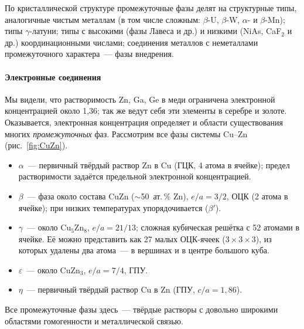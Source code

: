 По кристаллической структуре промежуточные фазы делят на структурные
типы, аналогичные чистым металлам (в том числе сложным: $\beta$-U,
$\beta$-W, $\alpha$- и $\beta$-Mn); типы $\gamma$-латуни; типы с высокими
(фазы Лавеса и др.) и низкими (NiAs, CaF$_2$ и др.) координационными
числами; соединения металлов с неметаллами промежуточного характера~—
фазы внедрения.

\paragraph{Электронные соединения}
Мы видели, что растворимость Zn, Ga, Ge в меди ограничена электронной
концентрацией около 1,36; так же ведут себя эти элементы в серебре и
золоте. Оказывается, электронная концентрация определяет и области
существования многих \emph{промежуточных} фаз. Рассмотрим все фазы
системы Cu--Zn (рис.~\ref{fig:CuZn}).
\begin{itemize}
\item $\alpha$~— первичный твёрдый раствор Zn в Cu (ГЦК, 4 атома в
ячейке); предел растворимости задаётся предельной электронной
концентрацией.
\item $\beta$~— фаза около состава CuZn ($\sim$50~ат.\,\% Zn), $e/a=3/2$,
ОЦК (2 атома в ячейке); при низких температурах упорядочивается
($\beta'$).
\item $\gamma$~— около Cu$_5$Zn$_8$, $e/a=21/13$; сложная кубическая
решётка с 52 атомами в ячейке. Её можно представить как 27 малых
ОЦК-ячеек ($3\times3\times3$), из которых удалены два атома~— в вершинах
и в центре большого куба.
\item $\varepsilon$~— около CuZn$_3$, $e/a=7/4$, ГПУ.
\item $\eta$~— первичный твёрдый раствор Cu в Zn (ГПУ, $c/a=1{,}86$).
\end{itemize}
Все промежуточные фазы здесь~— твёрдые растворы с довольно широкими
областями гомогенности и металлической связью.

